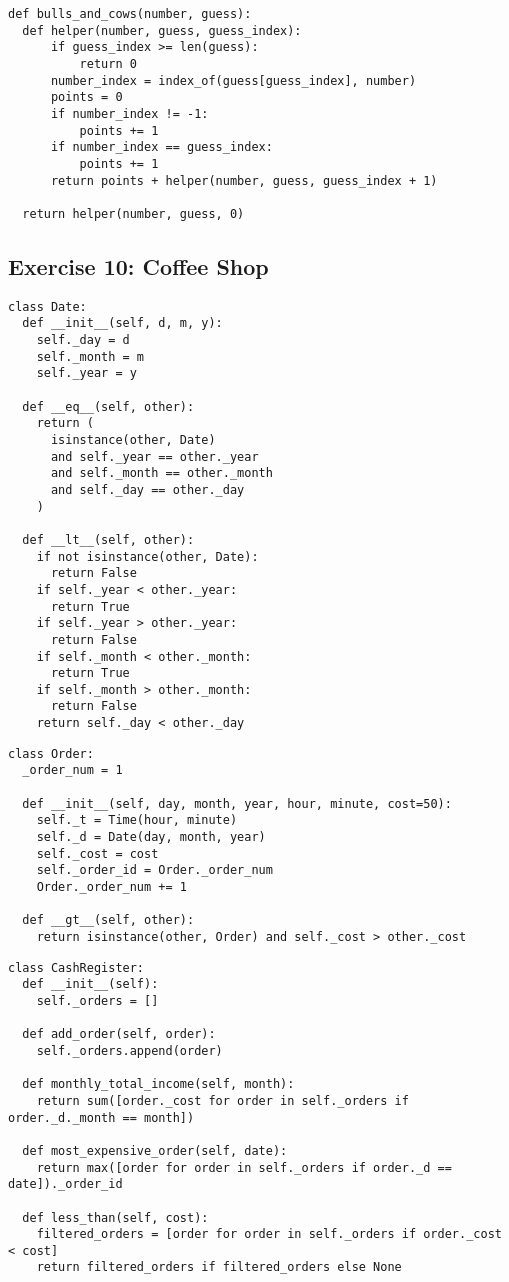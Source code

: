 \documentclass[11pt]{article}
\begin{document}
\begin{lstlisting}
def bulls_and_cows(number, guess):
  def helper(number, guess, guess_index):
      if guess_index >= len(guess):
          return 0
      number_index = index_of(guess[guess_index], number)
      points = 0
      if number_index != -1:
          points += 1
      if number_index == guess_index:
          points += 1
      return points + helper(number, guess, guess_index + 1)

  return helper(number, guess, 0)
\end{lstlisting}

\subsection{Exercise 10: Coffee Shop}\label{subsec:exercise-10}
\begin{lstlisting}
class Date:
  def __init__(self, d, m, y):
    self._day = d
    self._month = m
    self._year = y

  def __eq__(self, other):
    return (
      isinstance(other, Date)
      and self._year == other._year
      and self._month == other._month
      and self._day == other._day
    )

  def __lt__(self, other):
    if not isinstance(other, Date):
      return False
    if self._year < other._year:
      return True
    if self._year > other._year:
      return False
    if self._month < other._month:
      return True
    if self._month > other._month:
      return False
    return self._day < other._day
\end{lstlisting}

\begin{lstlisting}
class Order:
  _order_num = 1

  def __init__(self, day, month, year, hour, minute, cost=50):
    self._t = Time(hour, minute)
    self._d = Date(day, month, year)
    self._cost = cost
    self._order_id = Order._order_num
    Order._order_num += 1

  def __gt__(self, other):
    return isinstance(other, Order) and self._cost > other._cost
\end{lstlisting}

\begin{lstlisting}
class CashRegister:
  def __init__(self):
    self._orders = []

  def add_order(self, order):
    self._orders.append(order)

  def monthly_total_income(self, month):
    return sum([order._cost for order in self._orders if order._d._month == month])

  def most_expensive_order(self, date):
    return max([order for order in self._orders if order._d == date])._order_id

  def less_than(self, cost):
    filtered_orders = [order for order in self._orders if order._cost < cost]
    return filtered_orders if filtered_orders else None
\end{lstlisting}
\end{document}
